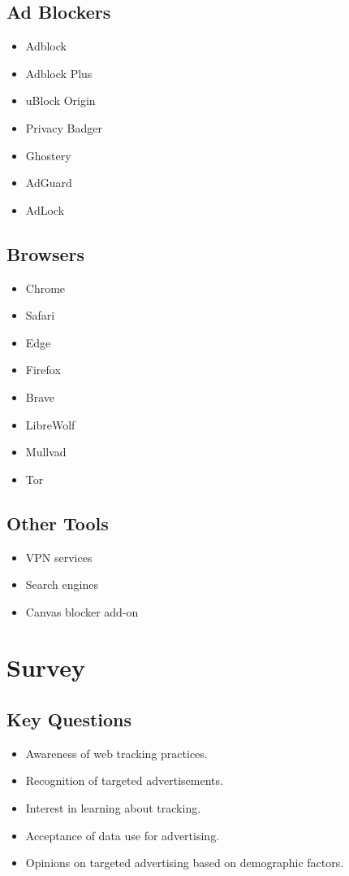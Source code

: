 \documentclass[12pt]{article}
\begin{document}
\subsection*{Ad Blockers}
\begin{itemize}
  \item Adblock
  \item Adblock Plus
  \item uBlock Origin
  \item Privacy Badger
  \item Ghostery
  \item AdGuard
  \item AdLock
\end{itemize}

\subsection*{Browsers}
\begin{itemize}
  \item Chrome
  \item Safari
  \item Edge
  \item Firefox
  \item Brave
  \item LibreWolf
  \item Mullvad
  \item Tor
\end{itemize}

\subsection*{Other Tools}
\begin{itemize}
  \item VPN services
  \item Search engines
  \item Canvas blocker add-on
\end{itemize}

\section*{Survey}

\subsection*{Key Questions}
\begin{itemize}
  \item Awareness of web tracking practices.
  \item Recognition of targeted advertisements.
  \item Interest in learning about tracking.
  \item Acceptance of data use for advertising.
  \item Opinions on targeted advertising based on demographic factors.
\end{itemize}
\end{document}
